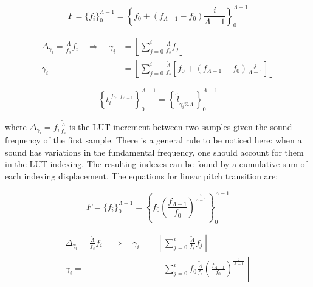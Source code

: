 \begin{equation}\label{freqLinear}
 F=\{f_i\}_0^{\Lambda-1}=\left\{f_0 + (f_{\Lambda-1}-f_0)\frac{i}{\Lambda-1} \right\}_0^{\Lambda-1}
\end{equation}

\begin{equation}\label{indiceLinear}
\begin{split}
	\Delta_{\gamma_i}=\frac{\widetilde{\Lambda}}{f_s}f_i \quad \Rightarrow \quad \gamma_i & = \left \lfloor \sum_{j=0}^{i} \frac{\widetilde{\Lambda}}{f_s}f_j \right \rfloor \\
	\gamma_i & =  \left \lfloor \sum_{j=0}^{i} \frac{\widetilde{\Lambda}}{f_s} \left [f_0 + (f_{\Lambda-1}-f_0)\frac{j}{\Lambda-1} \right ] \right \rfloor 
\end{split}
\end{equation}

\begin{equation}\label{serieAmostralLin}
 \left\{t_i^{\;\overline{f_0,\, f_{\Lambda-1}}}\right\}_0^{\Lambda-1}=\left\{\,\widetilde{l}_{\gamma_i \% \widetilde{\Lambda}}\,\right\}_0^{\Lambda-1}
\end{equation}

\noindent where $\Delta_{\gamma_i}=f_i\frac{\widetilde{\Lambda}}{f_s}$ is the LUT increment between two samples given the sound frequency of the first sample.
There is a general rule to be noticed here: when a sound has variations in the fundamental frequency,
one should account for them in the LUT indexing.
The resulting indexes can be found by a cumulative sum of each indexing displacement.
The equations for linear pitch transition are:

\begin{equation}\label{freqExponencial}
 F=\{f_i\}_0^{\Lambda-1}=  \left\{f_0 \left ( \frac{f_{\Lambda-1}}{f_0} \right ) ^{\frac{i}{\Lambda -1}} \right\}_0^{\Lambda-1}
\end{equation}

\begin{equation}\label{indiceExponencial}
\begin{split}
 \Delta_{\gamma_i}= \frac{\widetilde{\Lambda}}{f_s}f_i \quad \Rightarrow  \quad \gamma_i= & \left \lfloor \sum_{j=0}^{i} \frac{\widetilde{\Lambda}}{f_s}f_j \right \rfloor \\
	\gamma_i = & \left \lfloor \sum_{j=0}^{i} f_0 \frac{\widetilde{\Lambda}}{f_s} \left ( \frac{f_{\Lambda-1}}{f_0} \right ) ^{\frac{j}{\Lambda -1}} \right \rfloor
\end{split}
\end{equation}


